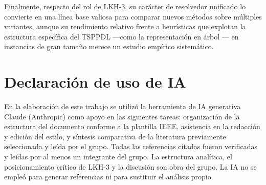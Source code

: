 \documentclass[conference]{IEEEtran}
\begin{document}
Finalmente, respecto del rol de LKH-3, su carácter de resolvedor unificado lo convierte en una línea base valiosa para comparar nuevos métodos sobre múltiples variantes, aunque su rendimiento relativo frente a heurísticas que explotan la estructura específica del TSPPDL —como la representación en árbol \cite{li2011}— en instancias de gran tamaño merece un estudio empírico sistemático.

\section*{Declaración de uso de IA}
En la elaboración de este trabajo se utilizó la herramienta de IA generativa Claude (Anthropic) como apoyo en las siguientes tareas: organización de la estructura del documento conforme a la plantilla IEEE, asistencia en la redacción y edición del estilo, y síntesis comparativa de la literatura previamente seleccionada y leída por el grupo. Todas las referencias citadas fueron verificadas y leídas por al menos un integrante del grupo. La estructura analítica, el posicionamiento crítico de LKH-3 y la discusión son obra del grupo. La IA no se empleó para generar referencias ni para sustituir el análisis propio.
\end{document}
